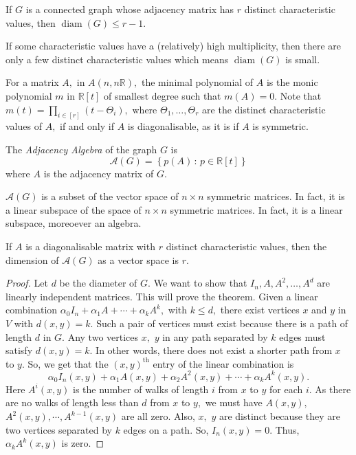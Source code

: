 \begin{theorem}
	If $G$ is a connected graph whose adjacency matrix has $r$ 
	distinct characteristic values, then $\operatorname{diam}(G)
	\leq r-1.$
\end{theorem}

\begin{remark}
	If some characteristic values have a (relatively) high
	multiplicity, then there are only a few distinct characteristic
	values which means $\operatorname{diam}(G)$ is small.
\end{remark}
For a matrix $A,$ in $A(n,n \mathbb{R}),$ the minimal
polynomial of $A$ is the monic polynomial $m$ in $\mathbb{R}[t]$
of smallest degree such that $m(A) = 0.$
Note that $m(t) = \prod_{i \in [r]} (t - \Theta_i),$  where
$\Theta_1, \dotsc, \Theta_r$ are the distinct characteristic values
of $A,$ if and only if $A$ is diagonalisable, as it is if $A$ is
symmetric.
\begin{definition}
	The \emph{Adjacency Algebra} of the graph $G$ is 
	$$ \mathcal{A}(G) = \left\{ p(A) \, : \, p \in \mathbb{R}[t] 
	\right\} $$
	where $A$ is the adjacency matrix of $G.$
\end{definition}

\begin{remark}
	$\mathcal{A}(G)$ is a subset of the vector space of
	$n \times n$ symmetric matrices. In fact, it is a linear 
	subspace of the space of $n \times n$ symmetric matrices.
	In fact, it is a linear subspace, moreoever an algebra.
\end{remark}

If $A$ is a diagonalisable matrix with $r$ distinct characteristic 
values, then the dimension of $\mathcal{A}(G)$ as a vector space is $r.$
\begin{proof}
	Let $d$ be the diameter of $G.$ We want to show that
	$I_n, A, A^2, \dots, A^d$ are linearly independent matrices.
	This will prove the theorem.
	Given a linear combination
	$\alpha_0 I_n + \alpha_1 A + \cdots + \alpha_k A^k,$
	with $k \leq d,$
	there exist vertices $x$ and $y$ in $V$ with $d(x,y) = k.$
	Such a pair of vertices must exist because there is a path of length $d$ in $G.$
	Any two vertices $x,$ $y$ in any path separated by $k$ edges
	must satisfy $d(x,y) = k.$
	In other words, there does not exist a shorter path
	from $x$ to $y.$ So, we get that the $(x,y)^\text{th}$ entry 
	of the linear combination
	is $$ \alpha_0 I_n(x,y) + \alpha_1 A(x,y) + \alpha_2 A^2(x,y)
	+ \cdots + \alpha_k A^k(x,y).$$
	Here $A^i(x,y)$ is the number of walks of length $i$ from $x$
	to $y$ for each $i.$ As there are no walks of length less than
	$d$ from $x$ to $y,$ we must have $A(x,y),$ $A^2(x,y), \cdots,
	A^{k-1}(x,y)$ are all zero. Also, $x,$ $y$ are distinct because
	they are two vertices separated by $k$ edges on a path. So,
	$I_n(x,y) = 0.$ Thus, $\alpha_k A^k(x,y)$ is zero.
\end{proof}

